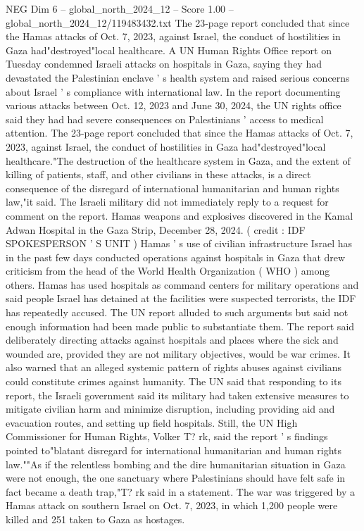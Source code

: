 \begin{textsample}{NEG Dim 6 – global\_north\_2024\_12 – Score 1.00 – global\_north\_2024\_12/119483432.txt}  \label{ex:f6_neg_184}
The 23-page report concluded that since the Hamas attacks of Oct. 7, 2023, against Israel, the conduct of hostilities in Gaza had"destroyed"local healthcare.
A UN Human Rights Office report on Tuesday condemned Israeli attacks on hospitals in Gaza, saying they had devastated the Palestinian enclave ' s health system and raised serious concerns about Israel ' s compliance with international law.
In the report documenting various attacks between Oct. 12, 2023 and June 30, 2024, the UN rights office said they had had severe consequences on Palestinians ' access to medical attention.
The 23-page report concluded that since the Hamas attacks of Oct. 7, 2023, against Israel, the conduct of hostilities in Gaza had"destroyed"local healthcare."The destruction of the healthcare system in Gaza, and the extent of killing of patients, staff, and other civilians in these attacks, is a direct consequence of the disregard of international humanitarian and human rights law,"it said.
The Israeli military did not immediately reply to a request for comment on the report.
Hamas weapons and explosives discovered in the Kamal Adwan Hospital in the Gaza Strip, December 28, 2024. ( credit : IDF SPOKESPERSON ' S UNIT ) Hamas ' s use of civilian infrastructure Israel has in the past few days conducted operations against hospitals in Gaza that drew criticism from the head of the World Health Organization ( WHO ) among others.
Hamas has used hospitals as command centers for military operations and said people Israel has detained at the facilities were suspected terrorists, the IDF has repeatedly accused.
The UN report alluded to such arguments but said not enough information had been made public to substantiate them.
The report said deliberately directing attacks against hospitals and places where the sick and wounded are, provided they are not military objectives, would be war crimes.
It also warned that an alleged systemic pattern of rights abuses against civilians could constitute crimes against humanity.
The UN said that responding to its report, the Israeli government said its military had taken extensive measures to mitigate civilian harm and minimize disruption, including providing aid and evacuation routes, and setting up field hospitals.
Still, the UN High Commissioner for Human Rights, Volker T? rk, said the report ' s findings pointed to"blatant disregard for international humanitarian and human rights law.""As if the relentless bombing and the dire humanitarian situation in Gaza were not enough, the one sanctuary where Palestinians should have felt safe in fact became a death trap,"T? rk said in a statement.
The war was triggered by a Hamas attack on southern Israel on Oct. 7, 2023, in which 1,200 people were killed and 251 taken to Gaza as hostages.

\end{textsample}

